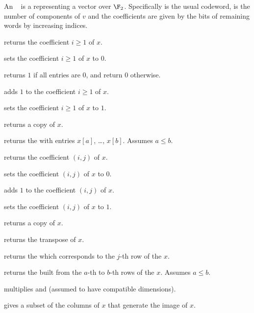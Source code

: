   An ~ is a
 representing a vector over $\F_2$. Specifically  is
the usual codeword,  is the number of components of $v$ and the
coefficients are given by the bits of remaining words by increasing indices.

 returns the coefficient $i\ge 1$ of $x$.

 sets the coefficient $i\ge 1$ of $x$ to
$0$.

 returns $1$ if all entries are $0$, and return
$0$ otherwise.

 adds $1$ to the coefficient $i\ge 1$ of $x$.

 sets the coefficient $i\ge 1$ of $x$ to $1$.

 returns a copy of $x$.

 returns the  with
entries $x[a]$, \dots, $x[b]$. Assumes $a \leq b$.

 returns the coefficient $(i,j)$
of $x$.

 sets the coefficient $(i,j)$ of $x$
to $0$.

 adds $1$ to the coefficient $(i,j)$
of $x$.

 sets the coefficient $(i,j)$ of $x$
to $1$.

 returns a copy of $x$.

 returns the transpose of $x$.

 returns the  which corresponds
to the $j$-th row of the  $x$.

 returns the  built
from the $a$-th to $b$-th rows of the  $x$. Assumes $a \leq b$.

 multiplies   and  (assumed
to have compatible dimensions).

 gives a subset of the columns of $x$ that generate
the image of $x$.


